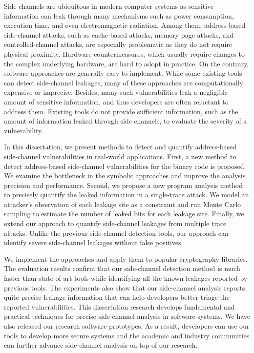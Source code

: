 
\vspace{-0.3in}
Side channels are ubiquitous in modern computer systems as sensitive
information can leak through many mechanisms such as power consumption, 
execution time, and even electromagnetic radiation. Among them, 
address-based side-channel attacks, such as cache-based attacks, 
memory page attacks, and controlled-channel attacks, are especially
problematic as they do not require physical proximity. Hardware 
countermeasures, which usually require changes to the complex 
underlying hardware, are hard to adopt in practice.  On the contrary, 
software approaches are generally easy to implement. While some existing 
tools can detect side-channel leakages, many of these approaches are 
computationally expensive or imprecise. Besides, many such vulnerabilities 
leak a negligible amount of sensitive information, and thus developers 
are often reluctant to address them. Existing tools do not provide sufficient 
information, such as the amount of information leaked through side channels, 
to evaluate the severity of a vulnerability.

In this dissertation, we present methods to detect and quantify 
address-based side-channel vulnerabilities in real-world applications. 
First, a new method to detect address-based side-channel vulnerabilities 
for the binary code is proposed. We examine the bottleneck in the symbolic 
approaches and improve the analysis precision and performance.
Second, we propose a new program analysis method to precisely quantify
the leaked information in a single-trace attack. We model an
attacker’s observation of each leakage site as a constraint and run
Monte Carlo sampling to estimate the number of leaked bits for each
leakage site. Finally, we extend our approach to quantify side-channel 
leakages from multiple trace attacks.  Unlike the previous side-channel 
detection tools, our approach can identify severe side-channel
leakages without false positives. 

We implement the approaches and apply them to popular cryptography libraries.  
The evaluation results confirm that our side-channel detection method 
is much faster than state-of-art tools while identifying all the known leakages 
reported by previous tools.
The experiments also show that 
our side-channel analysis reports quite precise leakage information
that can help developers better triage the reported vulnerabilities.
This dissertation research develops fundamental and practical techniques for precise side-channel 
analysis in software systems. We have also released our research software prototypes.
As a result, developers can use our tools to develop more secure systems and the academic and industry
communities can further advance side-channel analysis on top of our research.